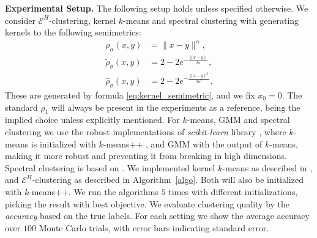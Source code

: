 \documentclass[twoside]{article}
\newcommand\kk{K}
\begin{document}
\textbf{Experimental Setup.} The following setup holds unless specified
otherwise. 
We consider
$\mathcal{E}^H$-clustering, kernel $k$-means and spectral clustering
with \mbox{generating} kernels to the following semimetrics:
\begin{equation}
\begin{split}
\rho_{\alpha}(x,y) &= \| x-y \|^{\alpha}, \\
%
\widetilde{\rho}_{\sigma}(x,y) &= 2 - 2 e^{-\tfrac{\|x-y\|}{2 \sigma}},  \\
%
\widehat{\rho}_{\sigma}(x,y) &= 2 - 2 e^{-\tfrac{\|x-y\|^2}{2 \sigma^2}}.  
\end{split}
\end{equation}
These are generated by formula \eqref{eq:kernel_semimetric},
and we fix $x_0=0$.
The standard $\rho_1$ will always be present in the experiments 
as a reference, being the implied choice unless explicitly mentioned.
For $k$-means, GMM and spectral clustering we use the robust 
implementations of \emph{scikit-learn} library \citep{scikit-learn}, where  
$k$-means is initialized with 
$k$-means++ \citep{Vassilvitskii}, 
and GMM with the output of $k$-means, making it more robust and preventing
it from breaking in high dimensions. 
Spectral clustering is based on \citep{Malik}. 
We implemented kernel $k$-means
as described in \citep{Dhillon2,Dhillon}, and $\mathcal{E}^H$-clustering
as described in Algorithm~\ref{algo}. Both
will also be initialized with $k$-means++.
We run the algorithms $5$ times with different initializations, picking
the result with best objective. 
We evaluate clustering quality by
the \emph{accuracy} based on the true labels. For each setting we show 
the average accuracy over $100$ Monte
Carlo trials, with error bars indicating standard error.
\end{document}
